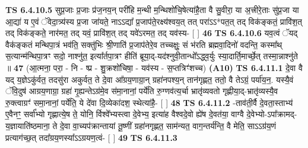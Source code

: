 \documentclass[17pt]{extarticle}
\begin{document}
                  \newline
                                \textbf{ TS 6.4.10.5} \newline
                  सुप्र॒जाः प्र॒जाः प्र॑ज॒नय॒न् परी॑हि म॒न्थी म॒न्थिशो॑चि॒षेत्या॑है॒ता वै सु॒वीरा॒ या अ॒त्त्रीरे॒ताः सु॑प्र॒जा या आ॒द्या॑ य ए॒वं ॅवेदा॒त्र्य॑स्य प्र॒जा जा॑यते॒ नाऽऽद्या᳚ प्र॒जाप॑ते॒रक्ष्य॑श्वय॒त् तत् परा॑ऽऽ*पत॒त् तद् विक॑ङ्कतं॒ प्रावि॑श॒त् तद् विक॑ङ्कते॒ नार॑मत॒ तद् यवं॒ प्रावि॑श॒त् तद् यवे॑ऽरमत॒ तद् यव॑स्य- [  ] \textbf{  46} \newline
                  \newline
                                \textbf{ TS 6.4.10.6} \newline
                  यव॒त्वं ॅयद् वैक॑ङ्कतं मन्थिपा॒त्रं भव॑ति॒ सक्तु॑भिः श्री॒णाति॑ प्र॒जाप॑तेरे॒व तच्चक्षुः॒ सं भ॑रति ब्रह्मवा॒दिनो॑ वदन्ति॒ कस्मा᳚थ् स॒त्यान्म॑न्थिपा॒त्रꣳ सदो॒ नाश्नु॑त॒ इत्या᳚र्तपा॒त्रꣳ हीति॑ ब्रूया॒द्-यद॑श्नुवी॒तान्धो᳚ऽद्ध्व॒र्युः स्या॒दार्ति॒मार्च्छे॒त् तस्मा॒न्नाश्नु॑ते ॥ \textbf{  47 } \newline
                  \newline
                      (आ॒त्मना॒ परा॒ - नि - ष्प्र - शु॒क्रशो॑चिषा॒ - यव॑स्य - स॒प्तत्रिꣳ॑शच्च)  \textbf{(A10)} \newline \newline
                                        \textbf{ TS 6.4.11.1} \newline
                  दे॒वा वै यद् य॒ज्ञेऽकु॑र्वत॒ तदसु॑रा अकुर्वत॒ ते दे॒वा आ᳚ग्रय॒णाग्रा॒न् ग्रहा॑नपश्य॒न् तान॑गृह्णत॒ ततो॒ वै तेऽग्रं॒ पर्या॑य॒न॒. यस्यै॒वं ॅवि॒दुष॑ आग्रय॒णाग्रा॒ ग्रहा॑ गृ॒ह्यन्तेऽग्र॑मे॒व स॑मा॒नानां॒ पर्ये॑ति रु॒ग्णव॑त्य॒र्चा भ्रातृ॑व्यवतो गृह्णीया॒द्-भ्रातृ॑व्यस्यै॒व रु॒क्त्वाग्रꣳ॑ समा॒नानां॒ पर्ये॑ति॒ ये दे॑वा दि॒व्येका॑दश॒ स्थेत्या॑है॒- [  ] \textbf{  48} \newline
                  \newline
                                \textbf{ TS 6.4.11.2} \newline
                  -ताव॑ती॒र्वै दे॒वता॒स्ताभ्य॑ ए॒वैनꣳ॒॒ सर्वा᳚भ्यो गृह्णात्ये॒ष ते॒ योनि॒ र्विश्वे᳚भ्यस्त्वा दे॒वेभ्य॒ इत्या॑ह वैश्वदे॒वो ह्ये॑ष दे॒वत॑या॒ वाग्वै दे॒वेभ्यो-ऽपा᳚क्रामद्-य॒ज्ञायाति॑ष्ठमाना॒ ते दे॒वा वा॒च्यप॑क्रान्तायां तू॒ष्णीं ग्रहा॑नगृह्णत॒ साम॑न्यत॒ वाग॒न्तर्य॑न्ति॒ वै मेति॒ साऽऽग्र॑य॒णं प्रत्याग॑च्छ॒त् तदा᳚ग्रय॒णस्या᳚ऽऽग्रयण॒त्वं- [  ] \textbf{  49} \newline
                  \newline
                                \textbf{ TS 6.4.11.3} \newline
\end{document}
